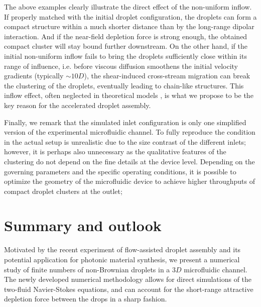 The above examples clearly illustrate the direct effect of the non-uniform inflow. If properly matched with the initial droplet configuration, the droplets can form a compact structure within a much shorter distance than by the long-range dipolar interaction. And if the near-field depletion force is strong enough, the obtained compact cluster will stay bound further downstream. On the other hand, if the initial non-uniform inflow fails to bring the droplets sufficiently close within its range of influence, i.e. before viscous diffusion smoothens the initial velocity gradients (typically $\sim 10D$), the shear-induced cross-stream migration can break the clustering of the droplets, eventually leading to chain-like structures. This inflow effect, often neglected in theoretical models \cite{Shen_2016AS}, is what we propose to be the key reason for the accelerated droplet assembly.

Finally, we remark that the simulated inlet configuration is only one simplified version of the experimental microfluidic channel. To fully reproduce the condition in the actual setup is unrealistic due to the size contrast of the different inlets; however, it is perhaps also unnecessary as the qualitative features of the clustering do not depend on the fine details at the device level. Depending on the governing parameters and the specific operating conditions, it is possible to optimize the geometry of the microfluidic device to achieve higher throughputs of compact droplet clusters at the outlet; 


\section{Summary and outlook}
\label{sec:summary}

Motivated by the recent experiment of flow-assisted droplet assembly \cite{Shen_2016AS} and its potential application for photonic material synthesis, we present a numerical study of finite numbers of non-Brownian droplets in a $3D$ microfluidic channel. The newly developed numerical methodology \cite{ICLS} allows for direct simulations of the two-fluid Navier-Stokes equations, and can account for the short-range attractive depletion force between the drops in a sharp fashion.


